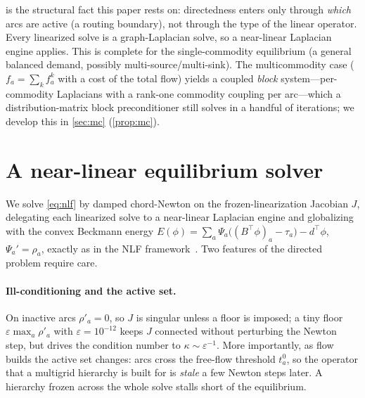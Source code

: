 \documentclass[ijoc]{informs3}
\begin{document}
 is the structural fact this paper rests on: directedness enters only through \emph{which}
arcs are active (a routing boundary), not through the type of the linear operator. Every linearized solve is a
graph-Laplacian solve, so a near-linear Laplacian engine applies. This is complete for the single-commodity
equilibrium (a general balanced demand, possibly multi-source/multi-sink). The multicommodity case
($f_a=\sum_k f_a^k$ with a cost of the total flow) yields a coupled \emph{block} system---per-commodity
Laplacians with a rank-one commodity coupling per arc---which a distribution-matrix block preconditioner still
solves in a handful of iterations; we develop this in \cref{sec:mc} (\cref{prop:mc}).

\section{A near-linear equilibrium solver}\label{sec:solver}
We solve \cref{eq:nlf} by damped chord-Newton on the frozen-linearization Jacobian $J$, delegating each
linearized solve to a near-linear Laplacian engine and globalizing with the convex Beckmann energy
$E(\phi)=\sum_a\Psi_a\big((B^\top\phi)_a-\tau_a\big)-d^\top\phi$, $\Psi_a'=\rho_a$, exactly as in the NLF
framework~\citep{nlf}. Two features of the directed problem require care.

\paragraph{Ill-conditioning and the active set.}
On inactive arcs $\rho'_a=0$, so $J$ is singular unless a floor is imposed; a tiny floor $\varepsilon\max_a\rho'_a$
with $\varepsilon=10^{-12}$ keeps $J$ connected without perturbing the Newton step, but drives the condition number
to $\kappa\sim\varepsilon^{-1}$. More importantly, as flow builds the active set changes: arcs cross the
free-flow threshold $t^0_a$, so the operator that a multigrid hierarchy is built for is \emph{stale} a few Newton
steps later. A hierarchy frozen across the whole solve stalls short of the equilibrium.
\end{document}

